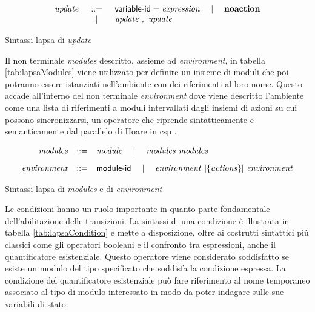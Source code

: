 \begin{table}[htbp!] %
$$
\begin{array}{rcl}
	\mathit{update} &::=& {\sf variable}\textrm{-}{\sf id} = \mathit{expression} \quad\mid\quad \mathbf{noaction} \\
		& \quad\mid\quad & \mathit{update} \mbox{ } , \mbox{ } \mathit{update} \\
\end{array}
$$
\caption{Sintassi \ac{lapsa} di \emph{update}}
\label{tab:lapsaUpdate}
\end{table}

Il non terminale \emph{modules} descritto, assieme ad \emph{environment}, in tabella \ref{tab:lapsaModules} viene utilizzato per definire un insieme di moduli che poi potranno essere istanziati nell'ambiente con dei riferimenti al loro nome. Questo accade all'interno del non terminale \emph{environment} dove viene descritto l'ambiente come una lista di riferimenti a moduli intervallati dagli insiemi di azioni su cui possono sincronizzarsi, un operatore che riprende sintatticamente e semanticamente dal parallelo di Hoare in \ac{csp} \cite{Hoare:1978:CSP}.

\begin{table}[htbp!] %
$$
\begin{array}{rcl}
	\mathit{modules} &::=& \mathit{module} \quad\mid\quad \mathit{modules} \mbox{ } \mathit{modules}
		\\[.3cm]
	\mathit{environment} &::=& {\sf module}\textrm{-}{\sf id} \quad\mid\quad \mathit{environment} \mbox{ }|{\{\mathit{actions}\}}|\mbox{ } \mathit{environment}
		\\
\end{array}
$$
\caption{Sintassi \ac{lapsa} di \emph{modules} e di \emph{environment}}
\label{tab:lapsaModules}
\end{table}

Le condizioni hanno un ruolo importante in quanto parte fondamentale dell'abilitazione delle transizioni. La sintassi di una condizione è illustrata in tabella \ref{tab:lapsaCondition} e mette a disposizione, oltre ai costrutti sintattici più classici come gli operatori booleani e il confronto tra espressioni, anche il quantificatore esistenziale. Questo operatore viene considerato soddisfatto se esiste un modulo del tipo specificato che soddisfa la condizione espressa. La condizione del quantificatore esistenziale può fare riferimento al nome temporaneo associato al tipo di modulo interessato in modo da poter indagare sulle sue variabili di stato.

